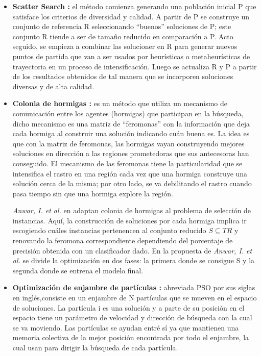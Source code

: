 \begin{itemize}
\item \textbf{Scatter Search \cite{talbi2009metaheuristics,glover1977heuristics}:}
el método comienza generando una población inicial P que satisface los criterios de diversidad y calidad. A partir de P se construye un conjunto de referencia R seleccionando ``buenos'' soluciones de P; este conjunto R tiende a ser de tamaño reducido en comparación a P. Acto seguido, se empieza a combinar las solucioner en R para generar nuevos puntos de partida que van a ser usados por heurísticas o metaheurísticas de trayectoria en un proceso de intensificación. Luego se actualiza R y P a partir de los resultados obtenidos de tal manera que se incorporen soluciones diversas y de alta calidad.

\item \textbf{Colonia de hormigas \cite{talbi2009metaheuristics,dorigo1992optimization}:}
es un método que utiliza un mecanismo de comunicación entre los agentes (hormigas) que participan en la búsqueda, dicho mecanismo es una matriz de ``feromonas'' con la información que deja cada hormiga al construir una solución indicando cuán buena es. La idea es que con la matriz de feromonas, las hormigas vayan construyendo mejores soluciones en dirección a las regiones prometedoras que sus antecesoras han conseguido. El mecanismo de las feromonas tiene la particularidad que se intensifica el rastro en una región cada vez que una hormiga construye una solución cerca de la misma; por otro lado, se va debilitando el rastro cuando pasa tiempo sin que una hormiga explore la región.

\emph{Anwar, I. et al.} en \cite{anwar2015instance,anwar2015adr} adaptan colonia de hormigas al problema de selección de instancias. Aquí, la construcción de soluciones por cada hormiga implica ir escogiendo cuáles instancias pertenencen al conjunto reducido $S \subseteq TR$ y renovando la feromona correspondiente dependiendo del porcentaje de precisión obtenida con un clasificador dado. En la propuesta de \emph{Anwar, I. et al.} se divide la optimización en dos fases: la primera donde se consigue S y la segunda donde se entrena el modelo final.

\item \textbf{Optimización de enjambre de partículas \cite{talbi2009metaheuristics,eberhart2001swarm}:}
abreviada PSO por sus siglas en inglés,consiste en un enjambre de N partículas que se mueven en el espacio de soluciones. La partícula i es una solución y a parte de su posición en el espacio tiene un parámetro de velocidad y dirección de búsqueda con la cual se va moviendo. Las partículas se ayudan entré sí ya que mantienen una memoria colectiva de la mejor posición encontrada por todo el enjambre, la cual usan para dirigir la búsqueda de cada partícula.


\end{itemize}
